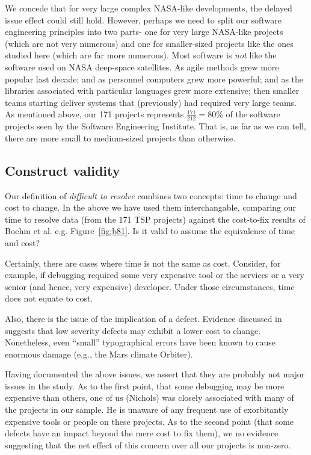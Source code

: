\documentclass{sig-alternate}
\newcommand{\fig}[1]{Figure~\ref{fig:#1}}
\begin{document}
We concede that for very large complex NASA-like developments, the delayed issue
effect could still hold. However, perhaps we need to split our software engineering principles
into two parts- one for   very large NASA-like projects (which are not very numerous)
and one for smaller-sized projects like the ones studied here (which are far more numerous).
Most software is {\em not} like the software used on NASA deep-space satellites.
As  agile methods grew more popular last decade; and as personnel computers grew more powerful;
and as the libraries associated with particular languages grew more extensive; then smaller
teams starting  deliver systems that (previously) had required very large teams.
As mentioned above,
our  171 projects represents $\frac{171}{212}=80$\% of the software projects
seen by the Software Engineering Institute.
That is, as far as we can tell,
there are more small to medium-sized projects than otherwise.



\subsection{Construct validity} 

Our definition of {\em difficult to resolve} combines two concepts: time to change and cost to
change. In the above we have used them interchangable, comparing our time to resolve data (from the 171 TSP projects) against the cost-to-fix results of Boehm et al. e.g. \fig{b81}.
Is it valid to assume the equivalence of time and cost?

Certainly, there are cases where time is not the same as cost. Consider, for example,
if debugging required some very expensive tool or the services or a very senior (and hence, very expensive)
developer. Under those circumstances, time does not equate to cost.

Also, there is the issue of the implication of  a defect. Evidence discussed in \cite{Shull02} suggests that low severity defects may exhibit a lower cost to change. Nonetheless, even ``small'' typographical errors have been known to cause enormous damage (e.g., the Mars climate Orbiter). 

Having documented the above issues, we assert that they are probably not major issues in the study.
As to the first point, that some debugging may be more expensive than others, one of us (Nichols)
was closely associated with many of the projects in our sample. He is unaware of any frequent
use of exorbitantly expensive tools or people on these projects. As to the second point (that
some defects have an impact beyond the mere cost to fix them), we no evidence suggesting
that the net effect of this concern over all our projects is non-zero.
\end{document}
